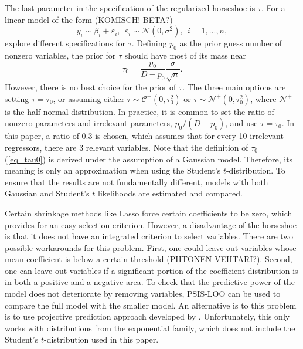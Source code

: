 The last parameter in the specification of the regularized horseshoe is $\tau$.
For a linear model of the form (KOMISCH! BETA?)
\begin{equation*}
    y_i \sim \beta_i + \varepsilon_i, ~~
    \varepsilon_i \sim \mathcal N(0, \sigma^2), ~~
    i = 1,...,n,
\end{equation*}
\cite{piironen_sparsity_2017} explore different specifications for $\tau$.
Defining $p_0$ as the prior guess number of nonzero variables, the prior for $\tau$ should have most of its mass near
\begin{equation}
    \displaystyle \tau_0 = \frac{p_0}{D-p_0}\frac{\sigma}{\sqrt n}.
    \label{eq_tau0}
\end{equation}
However, there is no best choice for the prior of $\tau$. The three main options are setting $\tau = \tau_0$, or assuming either $\tau \sim \mathcal C^+(0, \tau_0^2)$ or $\tau \sim \mathcal N^+(0, \tau_0^2)$, where $\mathcal{N^+}$ is the half-normal distribution.
In practice, it is common to set the ratio of nonzero parameters and irrelevant parameters, $p_0/(D - p_0)$, and use $\tau = \tau_0$.
In this paper, a ratio of 0.3 is chosen, which assumes that for every 10 irrelevant regressors, there are 3 relevant variables.
Note that the definition of $\tau_0$ (\ref{eq_tau0}) is derived under the assumption of a Gaussian model.
Therefore, its meaning is only an approximation when using the Student's $t$-distribution.
To ensure that the results are not fundamentally different, models with both Gaussian and Student's $t$ likelihoods are estimated and compared.

Certain shrinkage methods like Lasso force certain coefficients to be zero, which provides for an easy selection criterion.
However, a disadvantage of the horseshoe is that it does not have an integrated criterion to select variables. There are two possible workarounds for this problem.
First, one could leave out variables whose mean coefficient is below a certain threshold (PIITONEN VEHTARI?).
Second, one can leave out variables if a significant portion of the coefficient distribution is in both a positive and a negative area.
To check that the predictive power of the model does not deteriorate by removing variables, PSIS-LOO can be used to compare the full model with the smaller model. An alternative is to this problem is to use projective prediction approach developed by \cite{piironen_projective_2020}.
Unfortunately, this only works with distributions from the exponential family, which does not include the Student's $t$-distribution used in this paper.


